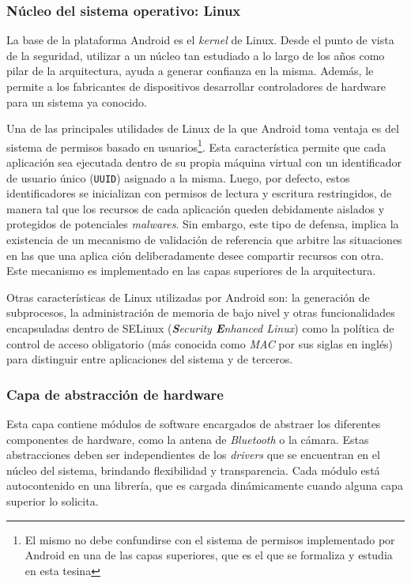 \subsubsection*{Núcleo del sistema operativo: Linux}
\label{section:architecture:kernel}
La base de la plataforma Android es el \textit{kernel} de Linux. Desde el punto de vista de la
seguridad, utilizar a un núcleo tan estudiado a lo largo de los años como pilar de la arquitectura,
ayuda a generar confianza en la misma. Además, le permite a los fabricantes de dispositivos
desarrollar controladores de hardware para un sistema ya conocido.

Una de las principales utilidades de Linux de la que Android toma ventaja es del sistema de permisos
basado en usuarios\footnote{El mismo no debe confundirse con el sistema de permisos implementado por
    Android en una de las capas superiores, que es el que se formaliza y estudia en esta tesina}. Esta
característica permite que cada aplicación sea ejecutada dentro de su propia máquina virtual con un
identificador de usuario único (\texttt{UUID}) asignado a la misma. Luego, por defecto, estos
identificadores se inicializan con permisos de lectura y escritura restringidos, de manera tal que
los recursos de cada aplicación queden debidamente aislados y protegidos de potenciales
\textit{malwares}. Sin embargo, este tipo de defensa, implica la existencia de un mecanismo de
validación de referencia que arbitre las situaciones en las que una aplica  ción deliberadamente desee
compartir recursos con otra. Este mecanismo es implementado en las capas superiores de la
arquitectura.

Otras características de Linux utilizadas por Android son: la generación de subprocesos, la
administración de memoria de bajo nivel y otras funcionalidades encapsuladas dentro de SELinux
(\textit{\textbf{S}ecurity \textbf{E}nhanced Linux}) como la política de control de acceso
obligatorio (más conocida como \textit{MAC} por sus siglas en inglés) para distinguir entre
aplicaciones del sistema y de terceros.

\subsubsection*{Capa de abstracción de hardware}
Esta capa contiene módulos de software encargados de abstraer los diferentes componentes de
hardware, como la antena de \textit{Bluetooth} o la cámara. Estas abstracciones deben ser
independientes de los \textit{drivers} que se encuentran en el núcleo del sistema, brindando
flexibilidad y transparencia. Cada módulo está autocontenido en una librería, que es cargada
dinámicamente cuando alguna capa superior lo solicita.

